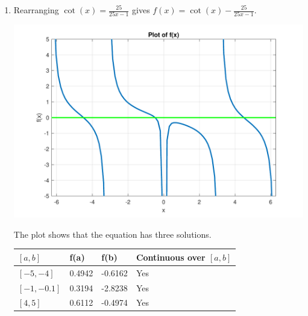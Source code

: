 \documentclass[a4paper,11pt]{article}
\begin{document}
\begin{enumerate}
\begin{enumerate}
		
		\item Rearranging $\cot(x) = \frac{25}{25x-1}$ gives $f(x) = \cot(x) 
		- \frac{25}{25x-1}$.
		
		\begin{center}
			\includegraphics[scale=0.5]{images/Q1a_iii.pdf}
		\end{center}
		The plot shows that the equation has three solutions. 
		\begin{center}
			\begin{tabular}{l|lll}
				$[a,b]$     & f(a)   & f(b)    & Continuous over $[a,b]$ \\ 
				\hline
				$[-5,-4]$   & 0.4942 & -0.6162 & Yes                     \\
				$[-1,-0.1]$ & 0.3194 & -2.8238 & Yes                     \\
				$[4,5]$     & 0.6112 & -0.4974 & Yes                    
			\end{tabular}
		\end{center}
	

\end{enumerate}
\end{enumerate}
\end{document}
